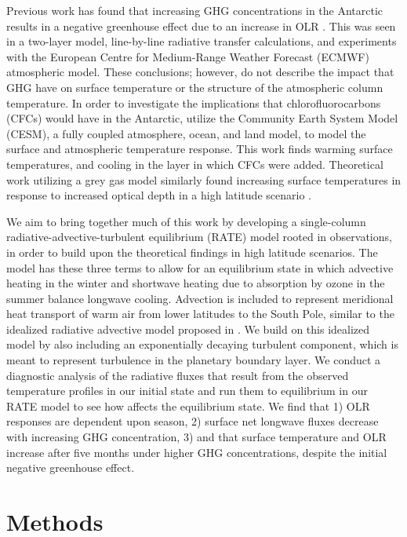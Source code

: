 \documentclass[12]{article}
\begin{document}
Previous work has found that increasing GHG concentrations in the Antarctic results in a negative greenhouse effect due to an increase in OLR \citep{schmithusen_how_2015}. This was seen in a two-layer model, line-by-line radiative transfer calculations, and experiments with the European Centre for Medium-Range Weather Forecast (ECMWF) atmospheric model. These conclusions; however, do not describe the impact that GHG have on surface temperature or the structure of the atmospheric column temperature. In order to investigate the implications that chlorofluorocarbons (CFCs) would have in the Antarctic, \cite{flanner_climate_2018} utilize the Community Earth System Model (CESM), a fully coupled atmosphere, ocean, and land model, to model the surface and atmospheric temperature response. This work finds warming surface temperatures, and cooling in the layer in which CFCs were added. Theoretical work utilizing a grey gas model similarly found increasing surface temperatures in response to increased optical depth in a high latitude scenario \citep{payne_conceptual_2015}.

We aim to bring together much of this work by developing a single-column radiative-advective-turbulent equilibrium (RATE) model rooted in observations, in order to build upon the theoretical findings in high latitude scenarios. The model has these three terms to allow for an equilibrium state in which advective heating in the winter and shortwave heating due to absorption by ozone in the summer balance longwave cooling. Advection is included to represent meridional heat transport of warm air from lower latitudes to the South Pole, similar to the idealized radiative advective model proposed in \cite{cronin_analytic_2016}. We build on this idealized model by also including an exponentially decaying turbulent component, which is meant to represent turbulence in the planetary boundary layer. We conduct a diagnostic analysis of the radiative fluxes that result from the observed temperature profiles in our initial state and run them to equilibrium in our RATE model to see how  affects the equilibrium state. We find that 1) OLR responses are dependent upon season, 2) surface net longwave fluxes decrease with increasing GHG concentration, 3) and that surface temperature and OLR increase after five months under higher GHG concentrations, despite the initial negative greenhouse effect.


\section{Methods}
\end{document}
